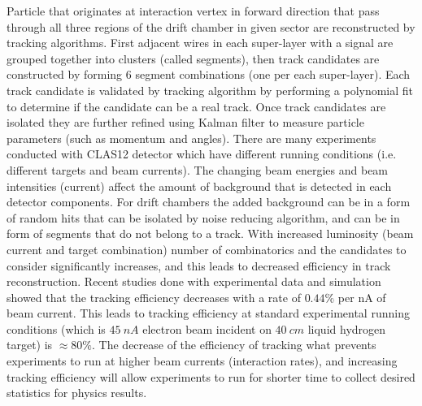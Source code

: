 Particle that originates at interaction vertex in forward direction that pass through all three regions of the drift chamber in given sector are reconstructed by tracking algorithms. First adjacent  wires in each super-layer with a signal are grouped together into clusters (called segments), then track candidates are constructed by forming 6 segment combinations (one per each super-layer). Each track candidate is validated by tracking algorithm by performing a polynomial fit to determine if the candidate can be a real track. Once track candidates are isolated they are further refined using Kalman filter to measure particle parameters (such as momentum and angles). 
There are many experiments conducted with CLAS12 detector which have different running conditions (i.e. different targets and beam currents).
The changing beam energies and beam intensities (current) affect the amount of background that is detected in each detector components. For drift chambers the added background can be in a form of random hits that can be isolated by noise reducing algorithm, and can be in form of segments that do not belong to a track. With increased luminosity (beam current and target combination) number of combinatorics and the candidates to consider significantly increases, and this leads to decreased efficiency in track reconstruction. Recent studies done with experimental data and simulation showed that the tracking efficiency decreases with a rate of $0.44\%$ per nA of beam current. This leads to tracking efficiency at standard experimental running conditions (which is $45~nA$ electron beam incident on $40~cm$ liquid hydrogen target) is $\approx 80\%$.
The decrease of the efficiency of tracking what prevents experiments to run at higher beam currents (interaction rates), and increasing tracking efficiency will allow experiments to run for shorter time to collect desired statistics for physics results. 